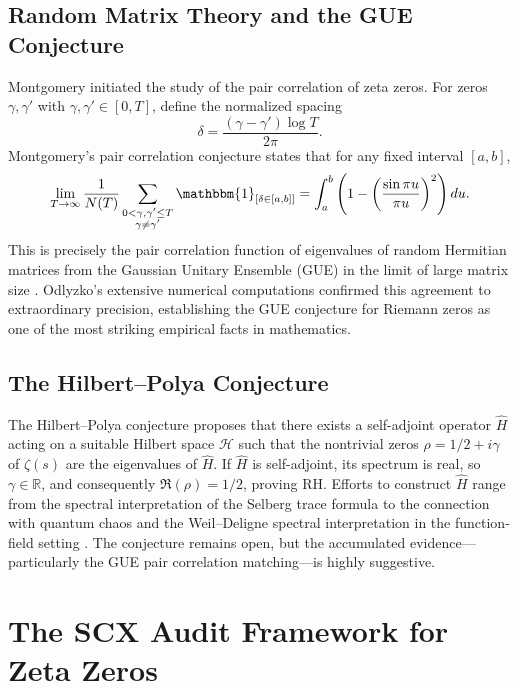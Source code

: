 \documentclass[12pt,a4paper]{article}
\theoremstyle{remark}
\newcommand{\R}{\mathbb{R}}
\newcommand{\Hilb}{\mathcal{H}}
\begin{document}
\subsection{Random Matrix Theory and the GUE Conjecture}
\label{sec:rmt}
Montgomery \cite{Montgomery1973} initiated the study of the pair correlation
of zeta zeros. For zeros $\gamma, \gamma'$ with
$\gamma, \gamma' \in [0, T]$, define the normalized spacing
\[
\delta = \frac{(\gamma - \gamma')\log T}{2\pi}.
\]
Montgomery's pair correlation conjecture states that for any fixed
interval $[a, b]$,
\[
\lim_{T\to\infty} \frac{1}{N(T)} \sum_{\substack{0 < \gamma, \gamma' \leq T
\\ \gamma \neq \gamma'}} \mathbbm{1}_{[\delta \in [a,b]]}
= \int_a^b \left(1 - \left(\frac{\sin \pi u}{\pi u}\right)^2\right) du.
\]
This is precisely the pair correlation function of eigenvalues of random
Hermitian matrices from the Gaussian Unitary Ensemble (GUE) in the limit
of large matrix size \cite{Mehta2004, Dyson1962}. Odlyzko's extensive
numerical computations \cite{Odlyzko1987, Odlyzko1992} confirmed this
agreement to extraordinary precision, establishing the GUE conjecture for
Riemann zeros as one of the most striking empirical facts in mathematics.
\subsection{The Hilbert--Polya Conjecture}
\label{sec:hp}
The Hilbert--Polya conjecture \cite{Polya1982, Montgomery1973} proposes that
there exists a self-adjoint operator $\widehat{H}$ acting on a suitable
Hilbert space $\Hilb$ such that the nontrivial zeros $\rho = 1/2 + i\gamma$
of $\zeta(s)$ are the eigenvalues of $\widehat{H}$. If $\widehat{H}$ is
self-adjoint, its spectrum is real, so $\gamma \in \R$, and consequently
$\Re(\rho) = 1/2$, proving RH.
Efforts to construct $\widehat{H}$ range from the spectral interpretation
of the Selberg trace formula \cite{Selberg1956} to the connection with
quantum chaos \cite{Berry1986, Gutzwiller1990} and the Weil--Deligne
spectral interpretation in the function-field setting
\cite{Weil1948, Deligne1974}. The conjecture remains open, but the
accumulated evidence---particularly the GUE pair correlation matching---is
highly suggestive.
\section{The SCX Audit Framework for Zeta Zeros}
\label{sec:scx_audit}
\end{document}
